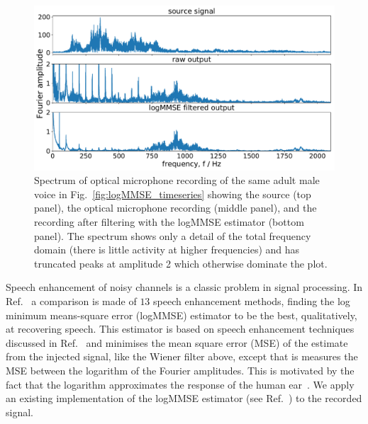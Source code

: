\documentclass[paper-main.tex]{subfiles}
\begin{document}
\begin{figure}
	\includegraphics[width=\textwidth]{figures/combined_spectrum_melatos.pdf}
	\caption{Spectrum of optical microphone recording of the same adult male voice in Fig.~\ref{fig:logMMSE_timeseries} showing the source (top panel), the optical microphone recording (middle panel), and the recording after filtering with the logMMSE estimator (bottom panel). The spectrum shows only a detail of the total frequency domain (there is little activity at higher frequencies) and has truncated peaks at amplitude 2 which otherwise dominate the plot.}
	\label{fig:logMMSE_spectrum}
\end{figure}


Speech enhancement of noisy channels is a classic problem in signal processing. 
In Ref.~\cite{SubjectiveComparison} a comparison is made of $13$ speech enhancement methods, finding the log minimum means-square error (logMMSE) estimator to be the best, qualitatively, at recovering speech. 
This estimator is based on speech enhancement techniques discussed in Ref.~\cite{Ephraim1984SpeechEU_logMMSE} and minimises the mean square error (MSE) of the estimate from the injected signal, like the Wiener filter above, except that is measures the MSE between the logarithm of the Fourier amplitudes. This is motivated by the fact that the logarithm approximates the response of the human ear~\cite{SubjectiveComparison}. We apply an existing implementation of the logMMSE estimator (see Ref.~\cite{logmmse}) to the recorded signal.
\end{document}
